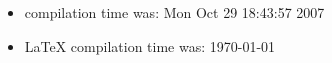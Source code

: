 \documentclass{article}
\begin{document}
\begin{itemize}
  \item \Rlogo{} compilation time was: Mon Oct 29 18:43:57 2007
  \item \LaTeX{} compilation time was: \today
\end{itemize}


\clearpage
{}


\end{document}
